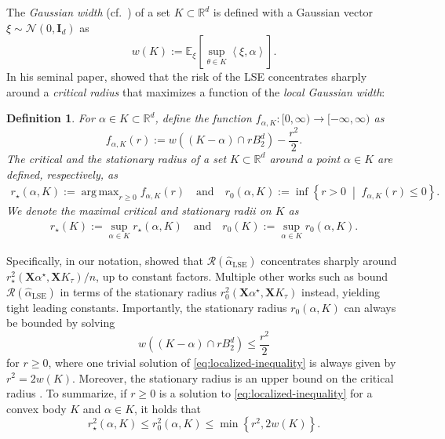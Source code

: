 \documentclass[a4paper]{article}
\newcommand{\mathset}[1]{\left\{#1\right\}}
\newcommand{\pr}[1]{\left(#1\right)}
\newcommand{\br}[1]{\left[#1\right]}
\newcommand{\setmid}[0]{\;\middle|\;}
\newcommand{\inner}[2]{\left\langle #1,#2\right\rangle}
\newcommand{\I}[0]{\mathbf{I}}
\newcommand{\X}[0]{\mathbf{X}}
\newcommand{\EE}[0]{\mathbb{E}}
\newcommand{\RR}[0]{\mathbb{R}}
\newcommand{\cN}[0]{\mathcal{N}}
\newcommand{\cR}[0]{\mathcal{R}}
\newcommand{\ha}[0]{\widehat{\alpha}}
\newcommand{\alphastar}{\alpha^\star}
\DeclareMathOperator{\LSEOp}{LSE}
\newcommand{\haLSE}[0]{\ha_{{\LSEOp}}}
\newcommand{\Kt}[0]{K_\tau}
\newcommand{\rstar}[0]{r_\star}
\newcommand{\rzero}[0]{r_{0}}
\DeclareMathOperator*{\argmax}{arg\,max}
\theoremstyle{thmstyle}
\theoremstyle{defstyle}
\newtheorem{definition}{Definition}
\theoremstyle{remark}
\begin{document}
The \emph{Gaussian width} (cf.\ \citet{Vershynin2018}) of a set $K\subset \RR^d$ is defined with a Gaussian vector $\xi\sim \cN(0,\I_{d})$ as $$w(K):=\EE_\xi\br{\sup_{\theta\in K}\inner{\xi}{\alpha}}.$$
In his seminal paper, \cite{Chatterjee2014} showed that the risk of the LSE concentrates sharply around a \emph{critical radius} that maximizes a function of the \emph{local Gaussian width}:
\begin{definition}
\label{def:critical-radius}
For $\alpha\in K\subset\RR^d$, define the function $f_{\alpha,K}:[0,\infty)\to [-\infty,\infty)$ as $$f_{\alpha,K} (r) := w\pr{ (K-\alpha) \cap rB^d_2}- \frac{r^2}{2}.$$
The \emph{critical} and the \emph{stationary radius} of a set $K\subset\RR^d$ around a point $\alpha\in K$ are defined, respectively, as
\begin{equation}
\label{eq:radii-definition}
    \begin{aligned}
        \rstar(\alpha,K):=\argmax_{r\geq 0}f_{\alpha,K}(r) \quad \text{and} \quad \rzero(\alpha,K):= \inf\mathset{r> 0 \setmid f_{\alpha,K}(r)\leq 0}.
    \end{aligned}
\end{equation}
We denote the maximal critical and stationary radii on $K$ as
\begin{align*}
    \rstar(K):= \sup_{\alpha\in K} \rstar(\alpha,K) \quad \text{and} \quad  \rzero(K):= \sup_{\alpha\in K} \rzero(\alpha,K).
\end{align*}
\end{definition}
\noindent Specifically, in our notation, \cite{Chatterjee2014} showed that $\cR(\haLSE)$ concentrates sharply around $\rstar^2(\X\alphastar,\X\Kt)/n$, up to constant factors. Multiple other works such as \cite{Bellec2016sharporacleinequalitiessquares,Prasadan2024some} bound $\cR(\haLSE)$ in terms of the stationary radius $\rzero^2(\X\alphastar,\X\Kt)$ instead, yielding tight leading constants.
Importantly, the stationary radius $\rzero(\alpha,K)$ can always be bounded by solving
\begin{equation}
\label{eq:localized-inequality}
    w\pr{(K-\alpha) \cap r B^d_2}\leq \frac{r^2}{2}
\end{equation}
for $r\geq 0$, where one trivial solution of \eqref{eq:localized-inequality} is always given by $r^2=2w(K)$.
Moreover, the stationary radius is an upper bound on the critical radius
\citep[Proposition 1.3]{Chatterjee2014}.
To summarize, if $r\geq 0$ is a solution to \eqref{eq:localized-inequality} for a convex body $K$ and $\alpha\in K$, it holds that 
\begin{equation}
\label{eq:radii-comparison}
    \rstar^2(\alpha,K)\leq \rzero^2(\alpha,K)\leq \min\mathset{r^2,2w(K)}.
\end{equation}
\end{document}
